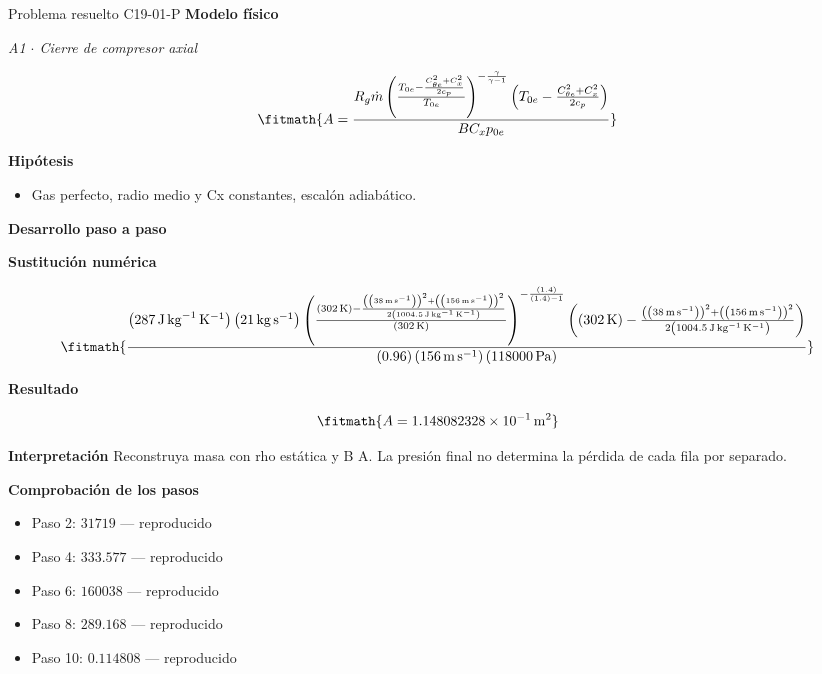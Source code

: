 \documentclass[10pt,openany]{book}
\begin{document}
\begin{studiumworked}{Problema resuelto C19-01-P}
\noindent\textbf{Modelo físico}

\noindent\textit{A1 \(\cdot\) Cierre de compresor axial}

\[
\fitmath{A=\frac{R_g \dot m \left(\frac{T_{0e} - \frac{C_{\theta e}^{2} + C_x^{2}}{2 c_p}}{T_{0e}}\right)^{- \frac{\gamma}{\gamma - 1}} \left(T_{0e} - \frac{C_{\theta e}^{2} + C_x^{2}}{2 c_p}\right)}{B C_x p_{0e}}}
\]

\noindent\textbf{Hipótesis}
\begin{itemize}
\item Gas perfecto, radio medio y Cx constantes, escalón adiabático.
\end{itemize}

\noindent\textbf{Desarrollo paso a paso}



\noindent\textbf{Sustitución numérica}

\[
\fitmath{\frac{\left(287\,\mathrm{J}\,\mathrm{kg}^{-1}\,\mathrm{K}^{-1}\right) \left(21\,\mathrm{kg}\,\mathrm{s}^{-1}\right) \left(\frac{\left(302\,\mathrm{K}\right) - \frac{\left(\left(38\,\mathrm{m}\,\mathrm{s}^{-1}\right)\right)^{2} + \left(\left(156\,\mathrm{m}\,\mathrm{s}^{-1}\right)\right)^{2}}{2 \left(1004.5\,\mathrm{J}\,\mathrm{kg}^{-1}\,\mathrm{K}^{-1}\right)}}{\left(302\,\mathrm{K}\right)}\right)^{- \frac{\left(1.4\right)}{\left(1.4\right) - 1}} \left(\left(302\,\mathrm{K}\right) - \frac{\left(\left(38\,\mathrm{m}\,\mathrm{s}^{-1}\right)\right)^{2} + \left(\left(156\,\mathrm{m}\,\mathrm{s}^{-1}\right)\right)^{2}}{2 \left(1004.5\,\mathrm{J}\,\mathrm{kg}^{-1}\,\mathrm{K}^{-1}\right)}\right)}{\left(0.96\right) \left(156\,\mathrm{m}\,\mathrm{s}^{-1}\right) \left(118000\,\mathrm{Pa}\right)}}
\]

\noindent\textbf{Resultado}

\[
\fitmath{A=1.148082328\times10^{-1}\,\mathrm{m}^{2}}
\]

\noindent\textbf{Interpretación}
Reconstruya masa con rho estática y B A. La presión final no determina la pérdida de cada fila por separado.

\noindent\textbf{Comprobación de los pasos}
\begin{itemize}
\item Paso 2: $31719$ — reproducido
\item Paso 4: $333.577$ — reproducido
\item Paso 6: $160038$ — reproducido
\item Paso 8: $289.168$ — reproducido
\item Paso 10: $0.114808$ — reproducido
\end{itemize}


\end{studiumworked}
\end{document}
